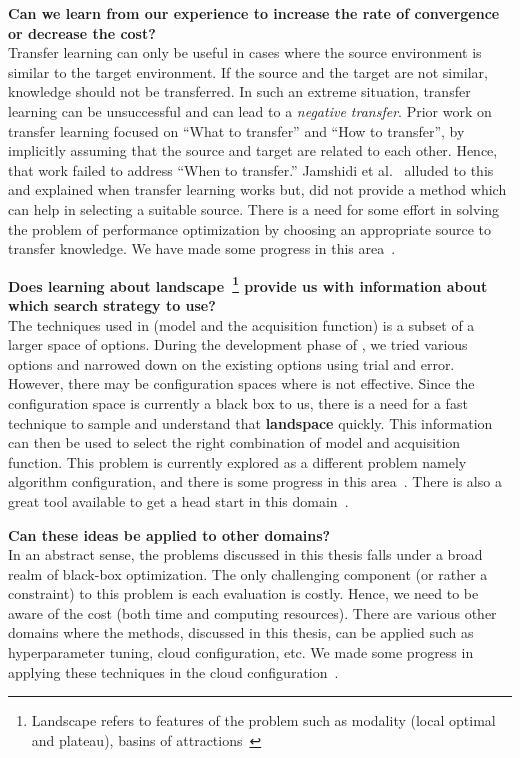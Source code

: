 \noindent\textbf{Can we learn from our experience to increase the rate of convergence or decrease the cost?}\\
Transfer learning can only be useful in cases where the source environment is similar to the target environment. If the source and the target are not similar, knowledge should not be transferred. In such an extreme situation, transfer learning can be unsuccessful and can lead to a \textit{negative transfer}. Prior work on transfer learning focused on ``What to transfer'' and ``How to transfer'', by implicitly assuming that the source and target are related to each other. Hence, that work failed to address “When to transfer.” Jamshidi et al.~\cite{jamshidi2017transfer} alluded to this and explained when transfer learning
works but, did not provide a method which can help in selecting a
suitable source. There is a need for some effort in solving the problem of performance optimization by choosing an appropriate source to transfer knowledge. We have made some progress in this area~\cite{nair2018transfer}.

\noindent\textbf{Does learning about landscape~\footnote{Landscape refers to features of the problem such as modality (local optimal and plateau), basins of attractions~\cite{mersmann2011exploratory}} provide us with information about which search strategy to use?}\\
The techniques used in \flash (model and the acquisition function) is a subset of a larger space of options. During the development phase of \flash, we tried various options and narrowed down on the existing options using trial and error. However, there may be configuration spaces where \flash is not effective. Since the configuration space is currently a black box to us, there is a need for a fast technique to sample and understand that \textbf{landspace} quickly. This information can then be used to select the right combination of model and acquisition function. This problem is currently explored as a different problem namely algorithm configuration, and there is some progress in this area~\cite{mersmann2011exploratory}. There is also a great tool available to get a head start in this domain~\cite{hanster2017flaccogui}.

\noindent\textbf{Can these ideas be applied to other domains?}\\
In an abstract sense, the problems discussed in this thesis falls under a broad realm of black-box optimization. The only challenging component (or rather a constraint) to this problem is each evaluation is costly. Hence, we need to be aware of the cost (both time and computing resources). There are various other domains where the methods, discussed in this thesis, can be applied such as hyperparameter tuning, cloud configuration, etc. We made some progress in applying these techniques in the cloud configuration~\cite{Hsu2018Arrow, Hsu2018Micky, Hsu2018Scout}. 

